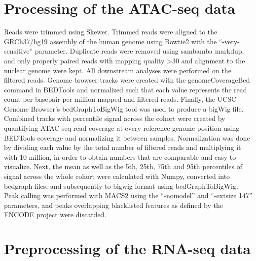 \documentclass[10pt,]{article}
\begin{document}
\section{Processing of the ATAC-seq
data}\label{processing-of-the-atac-seq-data}

Reads were trimmed using Skewer\citep{Jiang2014}. Trimmed reads were
aligned to the GRCh37/hg19 assembly of the human genome using
Bowtie2\citep{Langmead2012} with the ``-very-sensitive'' parameter.
Duplicate reads were removed using sambamba markdup\citep{Tarasov2015},
and only properly paired reads with mapping quality \textgreater{}30 and
alignment to the nuclear genome were kept. All downstream analyses were
performed on the filtered reads. Genome browser tracks were created with
the genomeCoverageBed command in BEDTools\citep{Quinlan2010} and
normalized such that each value represents the read count per basepair
per million mapped and filtered reads. Finally, the UCSC Genome
Browser's bedGraphToBigWig tool was used to produce a bigWig file.
Combined tracks with percentile signal across the cohort were created by
quantifying ATAC-seq read coverage at every reference genome position
using BEDTools coverage and normalizing it between samples.
Normalization was done by dividing each value by the total number of
filtered reads and multiplying it with 10 million, in order to obtain
numbers that are comparable and easy to visualize. Next, the mean as
well as the 5th, 25th, 75th and 95th percentiles of signal across the
whole cohort were calculated with Numpy, converted into bedgraph files,
and subsequently to bigwig format using bedGraphToBigWig. Peak calling
was performed with MACS2\citep{Zhang2008} using the ``-nomodel'' and
``-extsize 147'' parameters, and peaks overlapping blacklisted features
as defined by the ENCODE project\citep{Hoffman2013} were discarded.

\section{Preprocessing of the RNA-seq
data}\label{preprocessing-of-the-rna-seq-data}
\end{document}
